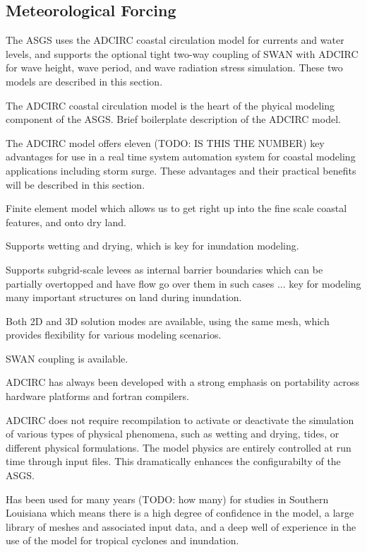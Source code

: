 \documentclass[jmse,article,submit,moreauthors,pdftex,12pt,a4paper]{mdpi}
\begin{document}
\subsection{Meteorological Forcing}

The ASGS uses the ADCIRC coastal circulation model for currents and 
water levels, and supports the optional tight two-way coupling of 
SWAN with ADCIRC for wave height, wave period, and wave radiation 
stress simulation. These two models are described in this section. 

The ADCIRC coastal circulation model is the heart of the phyical 
modeling component of the ASGS. Brief boilerplate description of the 
ADCIRC model. 

The ADCIRC model offers eleven (TODO: IS THIS THE NUMBER) key 
advantages for use in a real time system automation system for 
coastal modeling applications including storm surge. These 
advantages and their practical benefits will be described in this 
section. 

Finite element model which allows us to get right up into the fine 
scale coastal features, and onto dry land. 

Supports wetting and drying, which is key for inundation modeling.

Supports subgrid-scale levees as internal barrier boundaries which 
can be partially overtopped and have flow go over them in such cases 
... key for modeling many important structures on land during 
inundation. 

Both 2D and 3D solution modes are available, using the same mesh, 
which provides flexibility for various modeling scenarios. 

SWAN coupling is available. 


ADCIRC has always been developed with a strong emphasis on 
portability across hardware platforms and fortran compilers.

ADCIRC does not require recompilation to activate or deactivate the 
simulation of various types of physical phenomena, such as wetting 
and drying, tides, or different physical formulations. The model 
physics are entirely controlled at run time through input files. 
This dramatically enhances the configurabilty of the ASGS. 

Has been used for many years (TODO: how many) for studies in 
Southern Louisiana which means there is a high degree of confidence 
in the model, a large library of meshes and associated input data, 
and a deep well of experience in the use of the model for tropical 
cyclones and inundation. 
\end{document}
